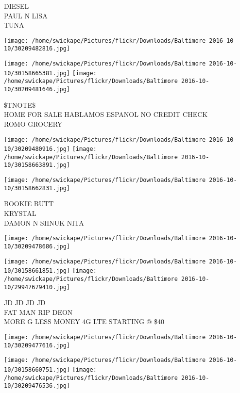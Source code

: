 \documentclass[10pt,letterpaper]{article}
\begin{document}
DIESEL\\
PAUL N LISA\\
TUNA\\
\pagebreak

\texttt{[image: /home/swickape/Pictures/flickr/Downloads/Baltimore 2016-10-10/30209482816.jpg]}

\vspace{0.25in}
\texttt{[image: /home/swickape/Pictures/flickr/Downloads/Baltimore 2016-10-10/30158665381.jpg]}
\texttt{[image: /home/swickape/Pictures/flickr/Downloads/Baltimore 2016-10-10/30209481646.jpg]}

\$TNOTE\$\\
HOME FOR SALE HABLAMOS ESPANOL NO CREDIT CHECK\\
ROMO GROCERY\\
\pagebreak

\texttt{[image: /home/swickape/Pictures/flickr/Downloads/Baltimore 2016-10-10/30209480916.jpg]}
\texttt{[image: /home/swickape/Pictures/flickr/Downloads/Baltimore 2016-10-10/30158663891.jpg]}

\vspace{0.25in}
\texttt{[image: /home/swickape/Pictures/flickr/Downloads/Baltimore 2016-10-10/30158662831.jpg]}

BOOKIE BUTT\\
KRYSTAL\\
DAMON N SHNUK NITA\\
\pagebreak

\texttt{[image: /home/swickape/Pictures/flickr/Downloads/Baltimore 2016-10-10/30209478686.jpg]}

\vspace{0.25in}
\texttt{[image: /home/swickape/Pictures/flickr/Downloads/Baltimore 2016-10-10/30158661851.jpg]}
\texttt{[image: /home/swickape/Pictures/flickr/Downloads/Baltimore 2016-10-10/29947679410.jpg]}

JD JD JD JD\\
FAT MAN RIP DEON\\
MORE G LESS MONEY 4G LTE STARTING @ \$40\\
\pagebreak

\texttt{[image: /home/swickape/Pictures/flickr/Downloads/Baltimore 2016-10-10/30209477616.jpg]}

\vspace{0.25in}
\texttt{[image: /home/swickape/Pictures/flickr/Downloads/Baltimore 2016-10-10/30158660751.jpg]}
\texttt{[image: /home/swickape/Pictures/flickr/Downloads/Baltimore 2016-10-10/30209476536.jpg]}
\end{document}
